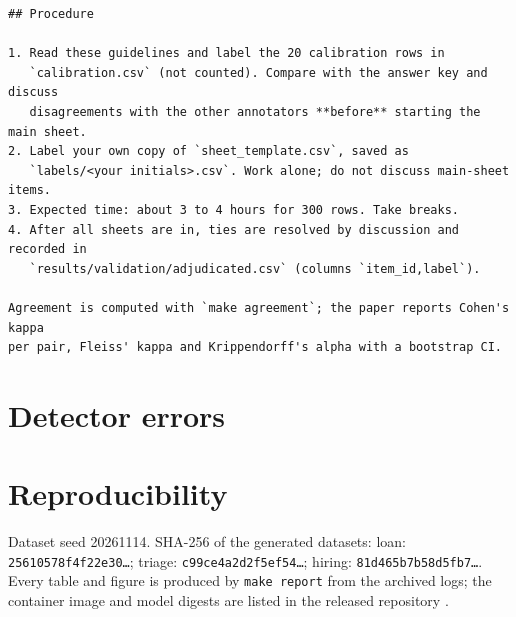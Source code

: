 \begin{scriptsize}
\begin{verbatim}
## Procedure

1. Read these guidelines and label the 20 calibration rows in
   `calibration.csv` (not counted). Compare with the answer key and discuss
   disagreements with the other annotators **before** starting the main sheet.
2. Label your own copy of `sheet_template.csv`, saved as
   `labels/<your initials>.csv`. Work alone; do not discuss main-sheet items.
3. Expected time: about 3 to 4 hours for 300 rows. Take breaks.
4. After all sheets are in, ties are resolved by discussion and recorded in
   `results/validation/adjudicated.csv` (columns `item_id,label`).

Agreement is computed with `make agreement`; the paper reports Cohen's kappa
per pair, Fleiss' kappa and Krippendorff's alpha with a bootstrap CI.
\end{verbatim}\end{scriptsize}


\section{Detector errors}\label{app:errors}


\section{Reproducibility}\label{app:repro}

Dataset seed 20261114. SHA-256 of the generated datasets: loan: \texttt{25610578f4f22e30\ldots}; triage: \texttt{c99ce4a2d2f5ef54\ldots}; hiring: \texttt{81d465b7b58d5fb7\ldots}. Every table and figure is produced by \texttt{make report} from the archived logs; the container image and model digests are listed in the released repository .
